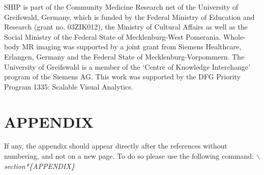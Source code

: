\documentclass[a4paper,twoside]{style/article}
\begin{document}
\noindent SHIP is part of the Community Medicine Research net of the University of Greifswald, Germany, which is funded by the Federal Ministry of Education and Research (grant no. 03ZIK012), the Ministry of Cultural Affairs as well as the Social Ministry of the Federal State of Mecklenburg-West Pomerania. Whole-body MR imaging was supported by a joint grant from Siemens Healthcare, Erlangen, Germany and the Federal State of Mecklenburg-Vorpommern. The University of Greifswald is a member of the ‘Centre of Knowledge Interchange’ program of the Siemens AG. This work was supported by the DFG Priority Program 1335: Scalable Visual Analytics.


\vfill

{\small
}


\section*{\uppercase{Appendix}}

\noindent If any, the appendix should appear directly after the
references without numbering, and not on a new page. To do so please use the following command:
\textit{$\backslash$section*\{APPENDIX\}}

\vfill
\end{document}
